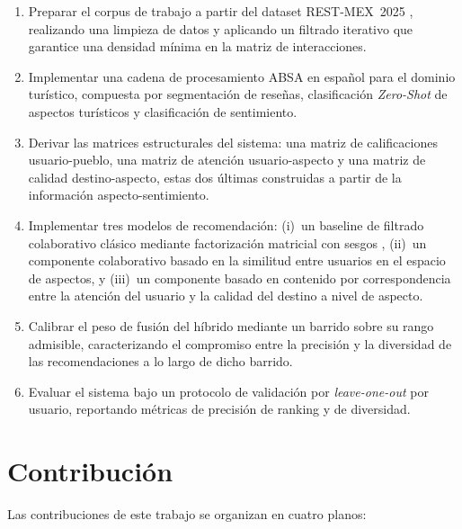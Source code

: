 \begin{enumerate}
	\item Preparar el corpus de trabajo a partir del dataset REST-MEX~2025 \citep{alvarez-carmona_overview_2025}, realizando una limpieza de datos y aplicando un filtrado iterativo que garantice una densidad mínima en la matriz de interacciones.

	\item Implementar una cadena de procesamiento ABSA en español para el dominio turístico, compuesta por segmentación de reseñas, clasificación \textit{Zero-Shot} de aspectos turísticos y clasificación de sentimiento.

	\item Derivar las matrices estructurales del sistema: una matriz de calificaciones usuario-pueblo, una matriz de atención usuario-aspecto y una matriz de calidad destino-aspecto, estas dos últimas construidas a partir de la información aspecto-sentimiento.

	\item Implementar tres modelos de recomendación: (i)~un baseline de filtrado colaborativo clásico mediante factorización matricial con sesgos \citep{koren_matrix_2009}, (ii)~un componente colaborativo basado en la similitud entre usuarios en el espacio de aspectos, y (iii)~un componente basado en contenido por correspondencia entre la atención del usuario y la calidad del destino a nivel de aspecto.

	\item Calibrar el peso de fusión del híbrido mediante un barrido sobre su rango admisible, caracterizando el compromiso entre la precisión y la diversidad de las recomendaciones a lo largo de dicho barrido.

	\item Evaluar el sistema bajo un protocolo de validación por \textit{leave-one-out} por usuario, reportando métricas de precisión de ranking y de diversidad.
\end{enumerate}

\section{Contribución} \label{sec:contribution}

Las contribuciones de este trabajo se organizan en cuatro planos:

